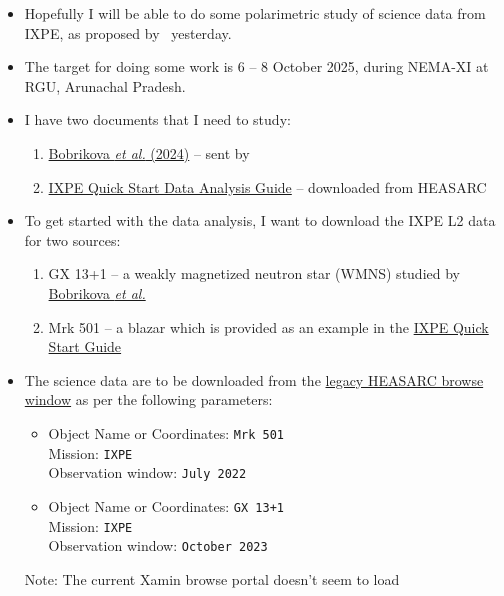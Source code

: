 	\begin{itemize}
		\item Hopefully I will be able to do some polarimetric study of science data from IXPE, as proposed by \MB\ yesterday.
		
		\item The target for doing some work is 6 -- 8 October 2025, during NEMA-XI at RGU, Arunachal Pradesh.
		
		\item I have two documents that I need to study:
		\begin{enumerate}
			\item \href{https://www.aanda.org/articles/aa/pdf/2024/08/aa50207-24.pdf}{Bobrikova \textit{et al.} (2024)} -- sent by \MB
			\item \href{https://heasarc.gsfc.nasa.gov/docs/ixpe/analysis/ixpe_quickstart.pdf}{IXPE Quick Start Data Analysis Guide} -- downloaded from HEASARC
		\end{enumerate}
		
		\item To get started with the data analysis, I want to download the IXPE L2 data for two sources:
		\begin{enumerate}
			\item GX 13+1 -- a weakly magnetized neutron star (WMNS) studied by \href{https://www.aanda.org/articles/aa/pdf/2024/08/aa50207-24.pdf}{Bobrikova \textit{et al.}}
			
			\item Mrk 501 --  a blazar which is provided as an example in the \href{https://heasarc.gsfc.nasa.gov/docs/ixpe/analysis/ixpe_quickstart.pdf}{IXPE Quick Start Guide}
		\end{enumerate}
		
		\item The science data are to be downloaded from the \href{https://heasarc.gsfc.nasa.gov/cgi-bin/W3Browse/w3browse.pl}{legacy HEASARC browse window} as per the following parameters:
		\begin{itemize}
			\item Object Name or Coordinates: \verb|Mrk 501|\\
			Mission: \verb|IXPE|\\
			Observation window: \verb|July 2022|
			
			\item Object Name or Coordinates: \verb|GX 13+1|\\
			Mission: \verb|IXPE|\\
			Observation window: \verb|October 2023|
		\end{itemize}
		Note: The current Xamin browse portal doesn't seem to load
	\end{itemize}